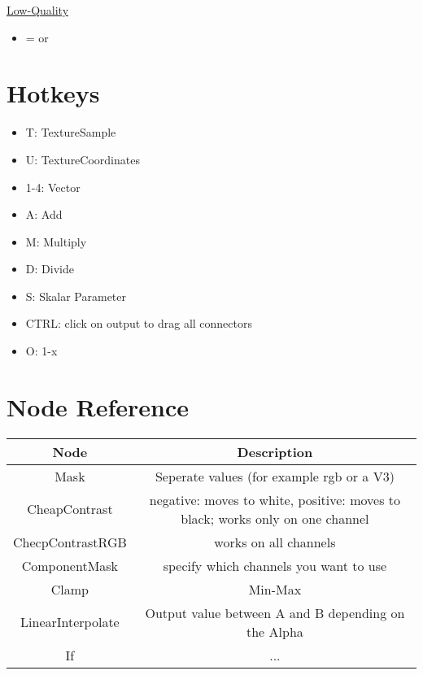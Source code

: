             \uline{Low-Quality}
            \begin{itemize}
                \item {} =  or 
            \end{itemize}
    \section{Hotkeys}
        \begin{itemize}
            \item T: TextureSample
            \item U: TextureCoordinates
            \item 1-4: Vector
            \item A: Add
            \item M: Multiply
            \item D: Divide
            \item S: Skalar Parameter
            \item CTRL: click on output to drag all connectors
            \item O: 1-x
        \end{itemize}

    \section{Node Reference}
        \begin{table}[H]
            \begin{tabular}{|c|c|}
                \hline
                    Node & Description \\
                \hline
                    Mask & Seperate values (for example rgb or a V3) \\
                    CheapContrast & negative: moves to white, positive: moves to black; works only on one channel \\
                    ChecpContrastRGB & works on all channels \\
                    ComponentMask & specify which channels you want to use \\
                    Clamp & Min-Max \\
                    LinearInterpolate & Output value between A and B depending on the Alpha \\
                    If & ... \\
                \hline
            \end{tabular}
        \end{table}


